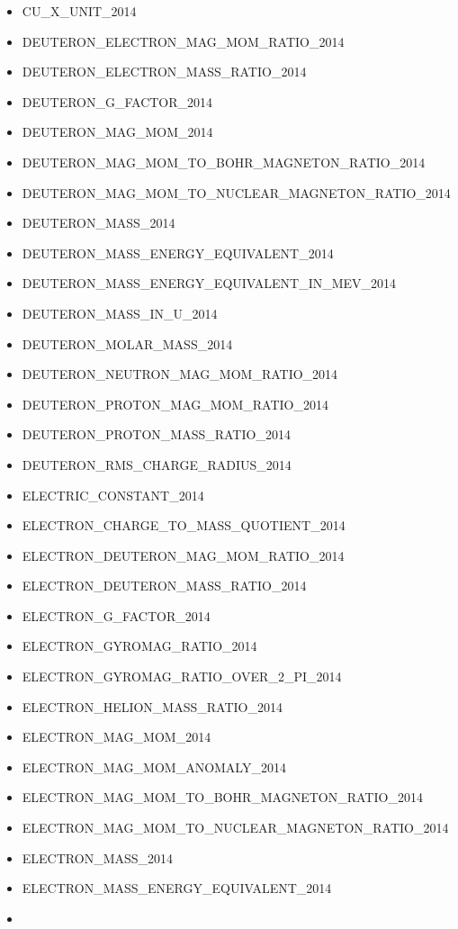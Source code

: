 \begin{itemize}
  CONVENTIONAL\_VALUE\_OF\_VON\_KLITZING\_CONSTANT\_2014
\item
  CU\_X\_UNIT\_2014
\item
  DEUTERON\_ELECTRON\_MAG\_MOM\_RATIO\_2014
\item
  DEUTERON\_ELECTRON\_MASS\_RATIO\_2014
\item
  DEUTERON\_G\_FACTOR\_2014
\item
  DEUTERON\_MAG\_MOM\_2014
\item
  DEUTERON\_MAG\_MOM\_TO\_BOHR\_MAGNETON\_RATIO\_2014
\item
  DEUTERON\_MAG\_MOM\_TO\_NUCLEAR\_MAGNETON\_RATIO\_2014
\item
  DEUTERON\_MASS\_2014
\item
  DEUTERON\_MASS\_ENERGY\_EQUIVALENT\_2014
\item
  DEUTERON\_MASS\_ENERGY\_EQUIVALENT\_IN\_MEV\_2014
\item
  DEUTERON\_MASS\_IN\_U\_2014
\item
  DEUTERON\_MOLAR\_MASS\_2014
\item
  DEUTERON\_NEUTRON\_MAG\_MOM\_RATIO\_2014
\item
  DEUTERON\_PROTON\_MAG\_MOM\_RATIO\_2014
\item
  DEUTERON\_PROTON\_MASS\_RATIO\_2014
\item
  DEUTERON\_RMS\_CHARGE\_RADIUS\_2014
\item
  ELECTRIC\_CONSTANT\_2014
\item
  ELECTRON\_CHARGE\_TO\_MASS\_QUOTIENT\_2014
\item
  ELECTRON\_DEUTERON\_MAG\_MOM\_RATIO\_2014
\item
  ELECTRON\_DEUTERON\_MASS\_RATIO\_2014
\item
  ELECTRON\_G\_FACTOR\_2014
\item
  ELECTRON\_GYROMAG\_RATIO\_2014
\item
  ELECTRON\_GYROMAG\_RATIO\_OVER\_2\_PI\_2014
\item
  ELECTRON\_HELION\_MASS\_RATIO\_2014
\item
  ELECTRON\_MAG\_MOM\_2014
\item
  ELECTRON\_MAG\_MOM\_ANOMALY\_2014
\item
  ELECTRON\_MAG\_MOM\_TO\_BOHR\_MAGNETON\_RATIO\_2014
\item
  ELECTRON\_MAG\_MOM\_TO\_NUCLEAR\_MAGNETON\_RATIO\_2014
\item
  ELECTRON\_MASS\_2014
\item
  ELECTRON\_MASS\_ENERGY\_EQUIVALENT\_2014
\item

\end{itemize}
